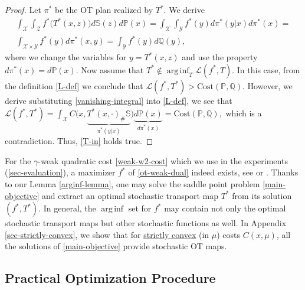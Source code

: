 \documentclass{article} %
\DeclareMathOperator*{\arginf}{arg\,inf}
\begin{document}
\vspace{-4mm}\begin{proof}Let $\pi^{*}$ be the OT plan realized by $T^{*}$. We derive
\begin{eqnarray}\int_{\mathcal{X}}\int_{\mathcal{Z}}f^{*}\big(T^{*}(x,z)\big) d\mathbb{S}(z) d\mathbb{P}(x)=
\int_{\mathcal{X}}\int_{\mathcal{Y}}f^{*}(y) d\pi^{*}(y|x) d\pi^{*}(x)=
\nonumber
\\
\int_{\mathcal{X}\times\mathcal{Y}}f^{*}(y) d\pi^{*}(x,y)=\int_{\mathcal{Y}}f^{*}(y) d\mathbb{Q}(y),
\label{vanishing-integral}
\end{eqnarray}
where we change the variables for $y=T^{*}(x,z)$ and use the property $d\pi^{*}(x)=d\mathbb{P}(x)$. Now assume that
$T^{*}\notin\arginf_{T}\mathcal{L}(f^{*},T)$. In this case, from the definition \eqref{L-def} we conclude that $\mathcal{L}(f^{*},T^{*})>\text{Cost}(\mathbb{P},\mathbb{Q})$. However, we derive substituting \eqref{vanishing-integral} into \eqref{L-def}, we see that 
$\mathcal{L}(f^{*},T^{*})=\int_{\mathcal{X}} C\big(x,\underbrace{T^{*}(x,\cdot)_{\#}\mathbb{S}}_{\pi^{*}(y|x)}\big)\underbrace{d\mathbb{P}(x)}_{d\pi^{*}(x)}\!=\!\text{Cost}(\mathbb{P},\mathbb{Q}),$
which is a contradiction. Thus, \eqref{T-in} holds true.
\end{proof}

\vspace{-3mm}For the $\gamma$-weak quadratic cost \eqref{weak-w2-cost} which we use in the experiments (\wasyparagraph\ref{sec-evaluation}), a maximizer $f^{*}$ of \eqref{ot-weak-dual} indeed exists, see \citep[]{alibert2019new} or \citep{gozlan2020mixture}. Thanks to our Lemma \ref{arginf-lemma},  one may solve the saddle point problem \eqref{main-objective} and extract an  optimal stochastic transport map $T^{*}$ from its solution $(f^{*},T^{*})$. In general, the $\arginf$ set for $f^{*}$ may contain not only the optimal stochastic transport maps but other stochastic functions as well. In Appendix \ref{sec-strictly-convex}, we show that for \underline{strictly convex} (in $\mu$) costs $C(x,\mu)$, all the solutions of \eqref{main-objective} provide stochastic OT maps.

\vspace{-3mm}\subsection{Practical Optimization Procedure}
\label{sec-optimization}
\end{document}
